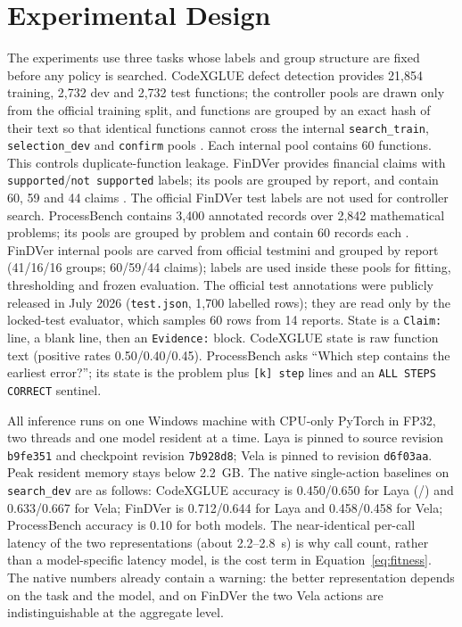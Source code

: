 \section{Experimental Design}

The experiments use three tasks whose labels and group structure are fixed
before any policy is searched. CodeXGLUE defect detection provides 21{,}854
training, 2{,}732 dev and 2{,}732 test functions; the controller pools are drawn
only from the official training split, and functions are grouped by an exact
hash of their text so that identical functions cannot cross the internal
\texttt{search\_train}, \texttt{selection\_dev} and \texttt{confirm} pools
\citep{lu2021codexglue,zhou2019devign}. Each internal pool contains 60
functions. This controls duplicate-function leakage. FinDVer provides financial claims with \texttt{supported}/\texttt{not
supported} labels; its pools are grouped by report, and contain 60, 59 and 44
claims \citep{zhao2024findver}. The official FinDVer test labels are not used
for controller search. ProcessBench contains 3{,}400 annotated records over
2{,}842 mathematical problems; its pools are grouped by problem and contain 60
records each \citep{zheng2025processbench,cobbe2021gsm8k,lightman2024verify,uesato2022process}.
FinDVer internal pools are carved from official testmini and grouped by report
(41/16/16 groups; 60/59/44 claims); labels are used inside these pools for
fitting, thresholding and frozen evaluation. The official test annotations were
publicly released in July 2026 (\texttt{test.json}, 1,700 labelled rows); they
are read only by the locked-test evaluator, which samples 60 rows from 14
reports. State is a \texttt{Claim:} line, a blank line, then an
\texttt{Evidence:} block. CodeXGLUE state is raw
function text
(positive rates 0.50/0.40/0.45). ProcessBench asks ``Which step contains the
earliest error?''; its state is the problem plus \texttt{[k] step} lines and an
\texttt{ALL STEPS CORRECT} sentinel.

All inference runs on one Windows machine with CPU-only PyTorch in FP32, two
threads and one model resident at a time. Laya is pinned to source revision
\texttt{b9fe351} and checkpoint revision \texttt{7b928d8}; Vela is pinned to
revision \texttt{d6f03aa}. Peak resident memory stays below 2.2~GB. The native
single-action baselines on \texttt{search\_dev} are as follows: CodeXGLUE
accuracy is 0.450/0.650 for Laya
(\noul/\choice) and 0.633/0.667 for Vela; FinDVer is 0.712/0.644 for Laya and
0.458/0.458 for Vela; ProcessBench \choice{} accuracy is 0.10 for both models.
The near-identical per-call latency of the two representations (about
2.2--2.8~s) is why call count, rather than a model-specific latency model, is
the cost term in Equation~\ref{eq:fitness}. The native numbers already contain a warning: the better representation depends
on the task and the model, and on FinDVer the two Vela actions are
indistinguishable at the aggregate level.

